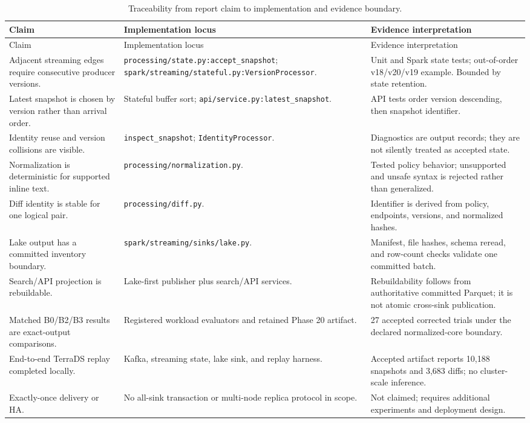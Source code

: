 \begin{longtable}{p{}p{}p{}}
\caption{Traceability from report claim to implementation and evidence boundary.}\label{tab:traceability}\\
\toprule
Claim & Implementation locus & Evidence interpretation \\
\midrule
\endfirsthead
\toprule
Claim & Implementation locus & Evidence interpretation \\
\midrule
\endhead
Adjacent streaming edges require consecutive producer versions. & \texttt{processing/state.py:accept\_snapshot}; \texttt{spark/streaming/stateful.py:VersionProcessor}. & Unit and Spark state tests; out-of-order v18/v20/v19 example. Bounded by state retention. \\
Latest snapshot is chosen by version rather than arrival order. & Stateful buffer sort; \texttt{api/service.py:latest\_snapshot}. & API tests order version descending, then snapshot identifier. \\
Identity reuse and version collisions are visible. & \texttt{inspect\_snapshot}; \texttt{IdentityProcessor}. & Diagnostics are output records; they are not silently treated as accepted state. \\
Normalization is deterministic for supported inline text. & \texttt{processing/normalization.py}. & Tested policy behavior; unsupported and unsafe syntax is rejected rather than generalized. \\
Diff identity is stable for one logical pair. & \texttt{processing/diff.py}. & Identifier is derived from policy, endpoints, versions, and normalized hashes. \\
Lake output has a committed inventory boundary. & \texttt{spark/streaming/sinks/lake.py}. & Manifest, file hashes, schema reread, and row-count checks validate one committed batch. \\
Search/API projection is rebuildable. & Lake-first publisher plus search/API services. & Rebuildability follows from authoritative committed Parquet; it is not atomic cross-sink publication. \\
Matched B0/B2/B3 results are exact-output comparisons. & Registered workload evaluators and retained Phase 20 artifact. & 27 accepted corrected trials under the declared normalized-core boundary. \\
End-to-end TerraDS replay completed locally. & Kafka, streaming state, lake sink, and replay harness. & Accepted artifact reports 10,188 snapshots and 3,683 diffs; no cluster-scale inference. \\
Exactly-once delivery or HA. & No all-sink transaction or multi-node replica protocol in scope. & Not claimed; requires additional experiments and deployment design. \\
\bottomrule
\end{longtable}

